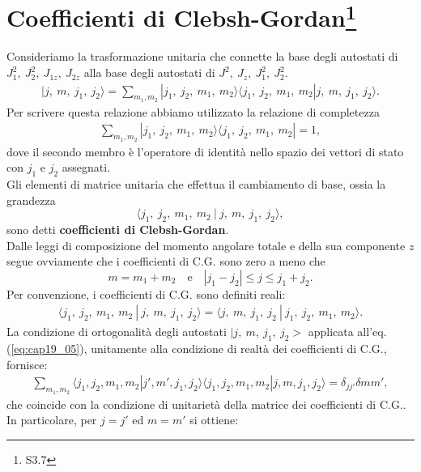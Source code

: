 \documentclass[a4paper,12pt,oneside]{book}
\begin{document}
\section[Coefficienti di Clebsh-Gordan]{Coefficienti di Clebsh-Gordan\footnote{S3.7}}
Consideriamo la trasformazione unitaria che connette la base degli autostati di $J_1^2 ,~ J_2^2 ,~ J_{1z} ,~ J_{2z}$ alla base degli autostati di  $J^2 ,~ J_z ,~ J_1^2 ,~ J_2^2$.
\begin{align} \label{eq:cap19_05}
| j ,~ m,~j_1, ~ j_2 \rangle  = \sum_{m_1, m_2} {| j_1 ,~ j_2,~m_1, ~ m_2 \rangle \langle j_1 ,~ j_2,~m_1, ~ m_2 |  j ,~ m,~j_1, ~ j_2 \rangle }.
\end{align}
Per scrivere questa relazione abbiamo utilizzato la relazione di completezza
\begin{align}
\sum_{m_1, m_2} {| j_1 ,~ j_2,~m_1, ~ m_2 \rangle \langle j_1 ,~ j_2,~m_1, ~ m_2 | = 1 },
\end{align}
dove il secondo membro è l'operatore di identità nello spazio dei vettori di stato con $j_1$ e $j_2$ assegnati. \\
Gli elementi di matrice unitaria che effettua il cambiamento di base, ossia la grandezza
\begin{equation}
\langle j_1 ,~ j_2,~m_1, ~ m_2 ~|~ j ,~ m,~j_1, ~ j_2 \rangle ,
\end{equation}
sono detti \textbf{coefficienti di Clebsh-Gordan}.\\
Dalle leggi di composizione del momento angolare totale e della sua componente $z$ segue ovviamente che i coefficienti di C.G. sono zero a meno che
\begin{equation}
m=m_1+m_2\quad \textrm{e}\quad |j_1-j_2| \leq j \leq j_1+j_2.
\end{equation}
Per convenzione, i coefficienti di C.G. sono definiti reali:
\begin{align}
\langle j_1 ,~ j_2,~m_1, ~ m_2~ |~ j ,~ m,~j_1, ~ j_2 \rangle  = \langle j ,~ m,~j_1, ~ j_2~ |~ j_1 ,~ j_2,~m_1, ~ m_2 \rangle .
\end{align}
La condizione di ortogonalità degli autostati $\mid j ,~ m,~j_1, ~ j_2 >$ applicata all'eq. (\ref{eq:cap19_05}), unitamente alla condizione di realtà dei coefficienti di C.G., fornisce:
\begin{align}
 \sum_{m_1, m_2} {\langle j_1 , j_2, m_1, m_2 | j' , m', j_1, j_2 \rangle  \langle j_1 , j_2, m_1, m_2  | j , m, j_1, j_2 \rangle } = \delta_{j j'} \delta{m m'},
\end{align}
che coincide con la condizione di unitarietà della matrice dei coefficienti di C.G.. In particolare, per $j=j'$ ed $m=m'$ si ottiene:
\end{document}
